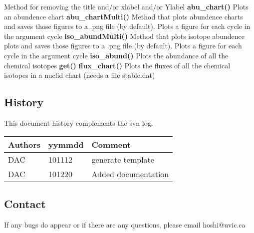 Method for removing the title and/or xlabel and/or Ylabel \newline
{\bf abu\_chart()}\newline 
Plots an abundence chart\newline
{\bf abu\_chartMulti()}\newline 
Method that plots abundence charts and saves those figures to a .png file (by default). Plots a figure for each cycle in the argument cycle\newline
{\bf iso\_abundMulti()}\newline 
Method that plots isotope abundence plots and saves those figures to a .png file (by default). Plots a figure for each cycle in the argument cycle\newline
{\bf iso\_abund()}\newline 
Plots the abundance of all the chemical isotopes
{\bf get()}\newline 
{\bf flux\_chart()}\newline
Plots the fluxes of all the chemical isotopes in a nuclid chart (needs a file stable.dat)
		
\subsection{History} 
This document history complements the svn log.

\begin{tabular*}{\textwidth}{lll}
\hline
Authors & yymmdd & Comment \\
\hline
DAC & 101112 & generate template \\
DAC & 101220 & Added documentation \\
\hline
\end{tabular*}


\subsection{Contact}
If any bugs do appear or if there are any questions, please email hoshi@uvic.ca
\begin{verbatim}

\end{verbatim}


%
%
%
%
